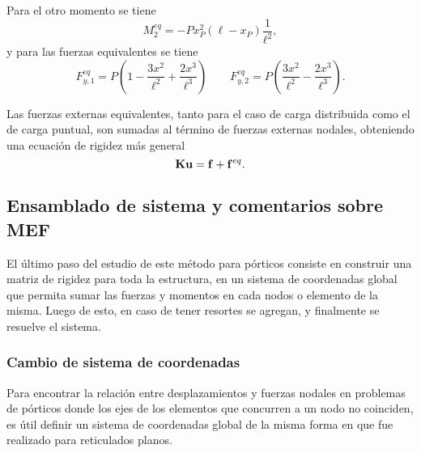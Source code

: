 Para el otro momento se tiene
\begin{equation}
	M_2^{eq} = -P x_P^2 (\ell-x_P) \frac{1}{\ell^2},
\end{equation}
%
y para las fuerzas equivalentes se tiene
%
\begin{equation}
	F_{y,1}^{eq} = P \left(1 - \frac{3 x^{2}}{\ell^{2}} + \frac{2 x^{3}}{\ell^{3}}\right) \qquad
	F_{y,2}^{eq} =
	P \left(\frac{3 x^{2}}{\ell^{2}} - \frac{2 x^{3}}{\ell^{3}}\right).
\end{equation}




Las fuerzas externas equivalentes, tanto para el caso de carga distribuida como el de carga puntual, son sumadas al término de fuerzas externas nodales, obteniendo una ecuación de rigidez más general
%
\begin{equation}
	{\bf K} {\bf u} = {\bf f} + {\bf f}^{eq}.
\end{equation}




\subsection{Ensamblado de sistema y comentarios sobre MEF}

El último paso del estudio de este método para pórticos consiste en construir una matriz de rigidez para toda la estructura, en un sistema de coordenadas global que permita sumar las fuerzas y momentos en cada nodos o elemento de la misma.
%
Luego de esto, en caso de tener resortes se agregan, y finalmente se resuelve el sistema.

\subsubsection{Cambio de sistema de coordenadas}

Para encontrar la relación entre desplazamientos y fuerzas nodales en problemas de pórticos donde los ejes de los elementos que concurren a un nodo no coinciden, es útil definir un sistema de coordenadas global de la misma forma en que fue realizado para reticulados planos.
%


